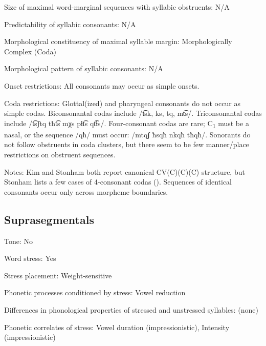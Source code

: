 {\begin{appendixdesc}
\item[Size of maximal word-marginal sequences with syllabic obstruents:] N/A

\item[Predictability of syllabic consonants:] N/A

\item[Morphological constituency of maximal syllable margin:] Morphologically Complex (Coda)

\item[Morphological pattern of syllabic consonants:] N/A

\item[Onset restrictions:] All consonants may occur as simple onsets.

\item[Coda restrictions:] Glottal(ized) and pharyngeal consonants do not occur as simple codas. Biconsonantal codas include /t͡sk, ks, tq, mt͡s/. Triconsonantal codas include /t͡sʃtq tħt͡s mχs pɬt͡s qt͡ɬs/. Four-consonant codas are rare; C\textsubscript{1} must be a nasal, or the sequence /qħ/ must occur: /mtqʃ ħsqħ nkqħ tħqħ/. Sonorants do not follow obstruents in coda clusters, but there seem to be few manner/place restrictions on obstruent sequences.

\item[Notes:] Kim and Stonham both report canonical CV(C)(C)(C) structure, but Stonham lists a few cases of 4-consonant codas (\citeyear[48]{Stonham1999}). Sequences of identical consonants occur only across morpheme boundaries.
\end{appendixdesc}
\subsection*{Suprasegmentals}
\begin{appendixdesc}
\item[Tone:] No

\item[Word stress:] Yes

\item[Stress placement:] Weight-sensitive

\item[Phonetic processes conditioned by stress:] Vowel reduction

\item[Differences in phonological properties of stressed and unstressed syllables:] (none)

\item[Phonetic correlates of stress:] Vowel duration (impressionistic), Intensity (impressionistic)


\end{appendixdesc}}
